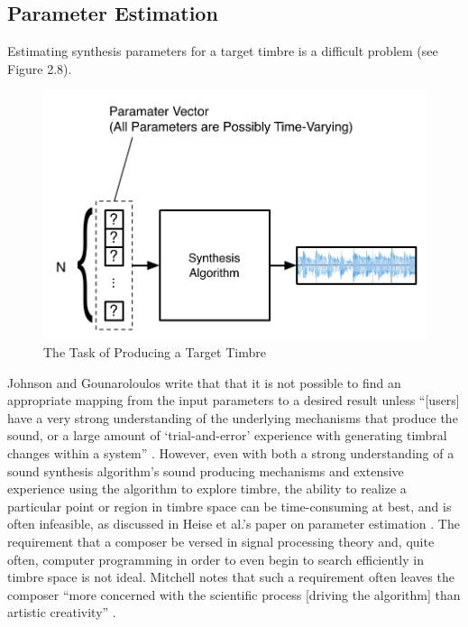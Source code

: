 \documentclass[12pt]{report} 	%
\numberwithin{figure}{chapter}
\numberwithin{table}{chapter}
\numberwithin{equation}{chapter}
\begin{document}
\begin{flushleft}
\section{Parameter Estimation}
Estimating synthesis parameters for a target timbre is a difficult problem (see Figure 2.8). 
\begin{figure}[h!]
\begin{center}
\includegraphics[scale=0.7]{ResynthesisProblem}
\caption[Producing a target timbre]{The Task of Producing a Target Timbre}
\end{center}
\end{figure}
Johnson and Gounaroloulos \cite{Johnson:2006pi} write that that it is not possible to find an appropriate mapping from the input parameters to a desired result unless ``[users] have a very strong understanding of the underlying mechanisms that produce the sound, or a large amount of `trial-and-error' experience with generating timbral changes within a system'' \cite[p. 1]{Johnson:2006pi}. However, even with both a strong understanding of a sound synthesis algorithm's sound producing mechanisms and extensive experience using the algorithm to explore timbre, the ability to realize a particular point or region in timbre space can be time-consuming at best, and is often infeasible, as discussed in Heise et al.'s paper on parameter estimation \cite[p. 1]{Heise:2009sp}. The requirement that a composer be versed in signal processing theory and, quite often, computer programming in order to even begin to search efficiently in timbre space is not ideal. Mitchell notes that such a requirement often leaves the composer ``more concerned with the scientific process [driving the algorithm] than artistic creativity'' \cite[p. 1]{Mitchell:2007fe}.


\end{flushleft}
\end{document}
